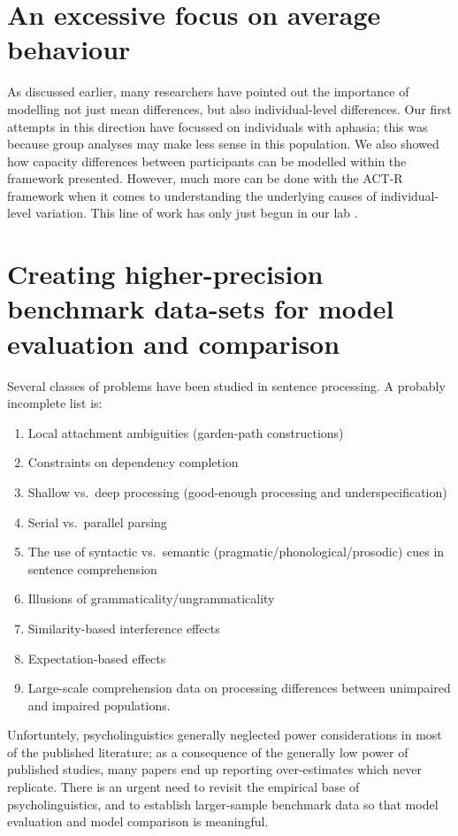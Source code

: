 \documentclass{cambridge7A}\usepackage[]{graphicx}\usepackage[]{color}
\begin{document}
\section{An excessive focus on average behaviour}

As discussed earlier, many researchers have pointed out the importance of modelling not just mean differences, but also individual-level differences. Our first attempts in this direction have focussed on individuals with aphasia; this was because group analyses may make less sense in this population. We also showed how capacity differences between participants can be modelled within the framework presented. However, much more can be done with the ACT-R framework when it comes to understanding the underlying causes of individual-level variation. This line of work has only just begun in our lab \citep{YadavEtAlAMLaP2020}.

\section{Creating higher-precision benchmark data-sets for model evaluation and comparison}

Several classes of problems have been studied in sentence processing. A probably incomplete list is:

\begin{enumerate}
\item Local attachment ambiguities (garden-path constructions)
\item Constraints on dependency completion
\item Shallow vs.\ deep processing (good-enough processing and underspecification)
\item Serial vs.\ parallel parsing
\item The use of syntactic vs.\ semantic (pragmatic/phonological/prosodic) cues in sentence comprehension
\item Illusions of grammaticality/ungrammaticality
\item Similarity-based interference effects
\item Expectation-based effects
\item Large-scale comprehension data on processing differences between unimpaired and impaired populations.
\end{enumerate}

Unfortuntely, psycholinguistics generally neglected power considerations in most of the published literature; as a consequence of the generally low power of published studies, many papers end up reporting over-estimates which never replicate. There is an urgent need to revisit the empirical base of psycholinguistics, and to establish larger-sample benchmark data so that model evaluation and model comparison is meaningful. 
\end{document}
